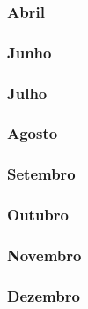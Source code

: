 \subsubsection*{Abril}
\subsubsection*{Junho}
\subsubsection*{Julho}
\subsubsection*{Agosto}
\subsubsection*{Setembro}
\subsubsection*{Outubro}
\subsubsection*{Novembro}
\subsubsection*{Dezembro}